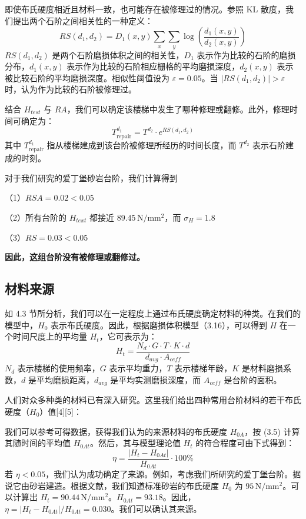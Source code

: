 \documentclass[11pt,a4paper]{ctexart}
\begin{document}
即使布氏硬度相近且材料一致，也可能存在被修理过的情况。参照 KL 散度，我们提出两个石阶之间相关性的一种定义：
\begin{equation}
RS(d_1,d_2)=D_1(x,y)\sum_x\sum_y\log\left(\frac{d_1(x,y)}{d_2(x,y)}\right) \tag{4.9}
\end{equation}
\(RS(d_1,d_2)\) 是两个石阶磨损体积之间的相关性，\(D_1\) 表示作为比较的石阶的磨损分布，\(d_1(x,y)\) 表示作为比较的石阶相应栅格的平均磨损深度，\(d_2(x,y)\) 表示被比较石阶的平均磨损深度。相似性阈值设为 \(\varepsilon=0.05\)。当 \(|RS(d_1,d_2)|>\varepsilon\) 时，认为作为比较的石阶被修理过。

结合 \(H_{test}\) 与 \(RA\)，我们可以确定该楼梯中发生了哪种修理或翻修。此外，修理时间可确定为：
\begin{equation}
T^{d_1}_{\mathrm{repair}}=T^{d_2}\cdot e^{RS(d_1,d_2)} \tag{4.10}
\end{equation}
其中 \(T^{d_1}_{\mathrm{repair}}\) 指从楼梯建成到该台阶被修理所经历的时间长度，而 \(T^{d_2}\) 表示石阶建成的时刻。

对于我们研究的爱丁堡砂岩台阶，我们计算得到

（1）\(RSA=0.02<0.05\)

（2）所有台阶的 \(H_{text}\) 都接近 \(89.45\,\mathrm{N/mm^2}\)，而 \(\sigma_H=1.8\)

（3）\(RS=0.03<0.05\)

\textbf{因此，这组台阶没有被修理或翻修过。}

\subsection{材料来源}

如 4.3 节所分析，我们可以在一定程度上通过布氏硬度确定材料的种类。在我们的模型中，\(H_0\) 表示布氏硬度。因此，根据磨损体积模型（3.16），可以得到 \(H\) 在一个时间尺度上的平均量 \(H_t\)，它可表示为：
\begin{equation}
H_t=\frac{N_d\cdot G\cdot T\cdot K\cdot d}{d_{avg}\cdot A_{ceff}} \tag{4.11}
\end{equation}
\(N_d\) 表示楼梯的使用频率，\(G\) 表示平均重力，\(T\) 表示楼梯年龄，\(K\) 是材料磨损系数，\(d\) 是平均磨损距离，\(d_{avg}\) 是平均实测磨损深度，而 \(A_{ceff}\) 是台阶的面积。

人们对众多种类的材料已有深入研究。这里我们给出四种常用台阶材料的若干布氏硬度（\(H_0\)）值[4][5]：

我们可以参考可得数据，获得我们认为的来源材料的布氏硬度 \(H_{0A}\)，按 (3.5) 计算其随时间的平均值 \(H_{0At}\)。然后，其与模型理论值 \(H_t\) 的符合程度可由下式得到：
\begin{equation}
\eta=\frac{|H_t-H_{0At}|}{H_{0At}}\cdot 100\% \tag{4.12}
\end{equation}
若 \(\eta<0.05\)，我们认为成功确定了来源。例如，考虑我们所研究的爱丁堡台阶。据说它由砂岩建造。根据文献，我们知道标准砂岩的布氏硬度 \(H_0\) 为 \(95\,\mathrm{N/mm^2}\)。可以计算出 \(H_t=90.44\,\mathrm{N/mm^2}\)。\(H_{0At}=93.18\)。因此，\(\eta=|H_t-H_{0At}|/H_{0At}=0.030\)。我们可以确认其来源。
\end{document}
